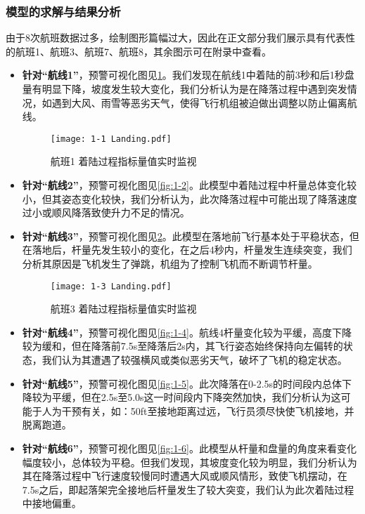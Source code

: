 \documentclass{MathorCupModeling}
\begin{document}
	\subsubsection{模型的求解与结果分析}
	由于8次航班数据过多，绘制图形篇幅过大，因此在正文部分我们展示具有代表性的航班1、航班3、航班7、航班8，其余图示可在附录中查看。
	\begin{itemize}
		\item \textbf{针对“航线1”}，预警可视化图见\textcolor{blue}{\cref{fig:1-1}}。我们发现在航线1中着陆的前3秒和后1秒盘量有明显下降，坡度发生较大变化，我们分析认为是在降落过程中遇到突发情况，如遇到大风、雨雪等恶劣天气，使得飞行机组被迫做出调整以防止偏离航线。
		\begin{figure}[H]
			\centering
			\texttt{[image: 1-1 Landing.pdf]}
			\caption{航班1 着陆过程指标量值实时监视}
			\label{fig:1-1}
		\end{figure}
		\item \textbf{针对“航线2”}，预警可视化图见\textcolor{blue}{\cref{fig:1-2}}。此模型中着陆过程中杆量总体变化较小，但其姿态变化较快，我们分析认为，此次降落过程中可能出现了降落速度过小或顺风降落致使升力不足的情况。

		\item \textbf{针对“航线3”}，预警可视化图见\textcolor{blue}{\cref{fig:1-3}}。此模型在落地前飞行基本处于平稳状态，但在落地后，杆量先发生较小的变化，在之后4秒内，杆量发生连续突变，我们分析其原因是飞机发生了弹跳，机组为了控制飞机而不断调节杆量。
		\begin{figure}[H]
			\centering
			\texttt{[image: 1-3 Landing.pdf]}
			\caption{航班3 着陆过程指标量值实时监视}
			\label{fig:1-3}
		\end{figure}
		\item \textbf{针对“航线4”}，预警可视化图见\textcolor{blue}{\cref{fig:1-4}}。航线4杆量变化较为平缓，高度下降较为缓和，但在降落前7.5s至降落后2s内，其飞行姿态始终保持向左偏转的状态，我们认为其遭遇了较强横风或类似恶劣天气，破坏了飞机的稳定状态。

		\item \textbf{针对“航线5”}，预警可视化图见\textcolor{blue}{\cref{fig:1-5}}。此次降落在0-2.5s的时间段内总体下降较为平缓，但在2.5s至5.0s这一时间段内下降突然加快，我们分析认为这可能于人为干预有关，如：50ft至接地距离过远，飞行员须尽快使飞机接地，并脱离跑道。

		\item \textbf{针对“航线6”}，预警可视化图见\textcolor{blue}{\cref{fig:1-6}}。此模型从杆量和盘量的角度来看变化幅度较小，总体较为平稳。但我们发现，其坡度变化较为明显，我们分析认为其在降落过程中飞行速度较慢同时遭遇大风或顺风情形，致使飞机摆动，在7.5s之后，即起落架完全接地后杆量发生了较大突变，我们认为此次着陆过程中接地偏重。


\end{itemize}
\end{document}
